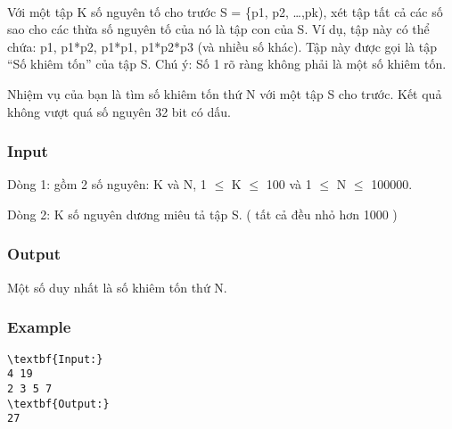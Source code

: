 

 

Với một tập K số nguyên tố cho trước S = \{p1, p2, …,pk), xét tập tất cả các số sao cho các thừa số nguyên tố của nó là tập con của S. Ví dụ, tập này có thể chứa: p1, p1*p2, p1*p1, p1*p2*p3 (và nhiều số khác). Tập này được gọi là tập “Số khiêm tốn” của tập S. Chú ý: Số 1 rõ ràng không phải là một số khiêm tốn.

Nhiệm vụ của bạn là tìm số khiêm tốn thứ N với một tập S cho trước. Kết quả không vượt quá số nguyên 32 bit có dấu.

\subsubsection{Input}

Dòng 1: gồm 2 số nguyên: K và N, 1  $\le$  K  $\le$  100 và 1  $\le$  N  $\le$  100000.

Dòng 2: K số nguyên dương miêu tả tập S. ( tất cả đều nhỏ hơn 1000 )

\subsubsection{Output}

Một số duy nhất là số khiêm tốn thứ N.

\subsubsection{Example}
\begin{verbatim}
\textbf{Input:}
4 19
2 3 5 7
\textbf{Output:}
27\end{verbatim}
